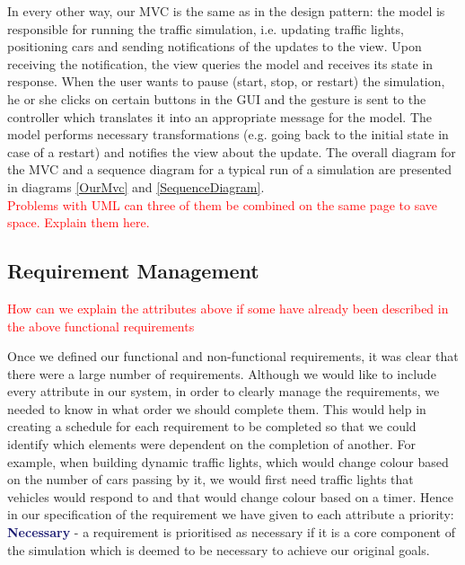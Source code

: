 \documentclass{article}
\begin{document}
   In every other way, our MVC is the same as in the design pattern: the model is responsible for running the traffic simulation, i.e. updating traffic lights, positioning cars and sending notifications of the updates to the view. Upon receiving the notification, the view queries the model and receives its state in response. 
   When the user wants to pause (start, stop, or restart) the simulation, he or she clicks on certain buttons in the GUI and the gesture is sent to the controller which translates it into an appropriate message for the model. 
   The model performs necessary transformations (e.g. going back to the initial state in case of a restart) and notifies the view about the update. 
   The overall diagram for the MVC and a sequence diagram for a typical run of a simulation are presented in diagrams \ref{OurMvc} and \ref{SequenceDiagram}. \\
   
\textcolor{red}{Problems with UML can three of them be combined on the same page to save space. Explain them here.}

\subsection{Requirement Management}\label{Requirement Management}
\textcolor{red}{How can we explain the attributes above if some have already been described in the above functional requirements\\
}

Once we defined our functional and non-functional requirements, it was clear that there were a large number of requirements. 
Although we would like to include every attribute in our system, in order to clearly manage the requirements, we needed to know in what order we should complete them. 
This would help in creating a schedule for each requirement to be completed so that we could identify which elements were dependent on the completion of another. 
For example, when building dynamic traffic lights, which would change colour based on the number of cars passing by it, we would first need traffic lights that vehicles would respond to and that would change colour based on a timer. 
Hence in our specification of the requirement we have given to each attribute a priority:\\

\noindent
\textcolor{MidnightBlue}{\bf Necessary}
- a requirement is prioritised as necessary if it is a core component of the simulation which is deemed to be necessary to achieve our original goals.\\
\end{document}
